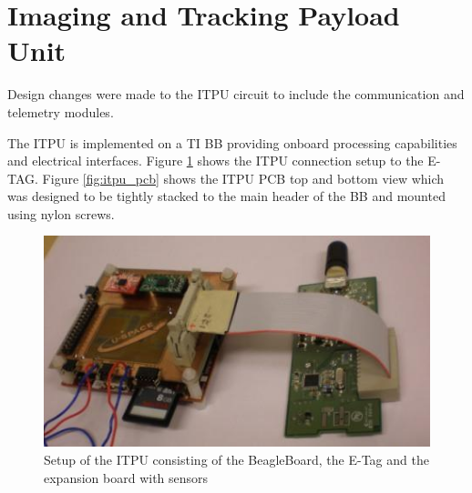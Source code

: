  
\section{Imaging and Tracking Payload Unit}
\label{sec:changes_itpu}

Design changes were made to the ITPU circuit to include the communication and telemetry modules.

The \ac{ITPU} is implemented on a \acl{TI} \ac{BB} providing onboard processing capabilities and electrical interfaces. Figure \ref{fig:itpu_setup} shows the \ac{ITPU} connection setup to the \ac{E-TAG}. Figure \ref{fig:itpu_pcb} shows the \ac{ITPU} \ac{PCB} top and bottom view which was designed to be tightly stacked to the main header of the \ac{BB} and mounted using nylon screws.
%
\begin{figure}[h!]
\begin{centering}
\includegraphics[height=0.25\textheight]{figures/itpu-setup.jpg}
\par\end{centering}
\caption{Setup of the ITPU consisting of the BeagleBoard, the E-Tag and the expansion board with sensors}
\label{fig:itpu_setup}
\end{figure}
%
%
